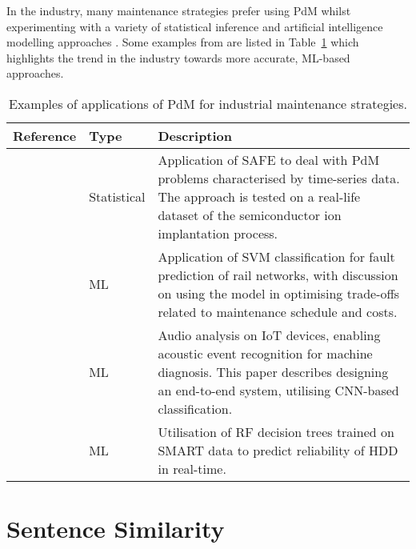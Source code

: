 \documentclass[10pt,oneside]{report}
\begin{document}
In the industry, many maintenance strategies prefer using PdM whilst experimenting with a variety of statistical inference and artificial intelligence modelling approaches \cite{mobley2002introduction, jezzini2013effects}. Some examples from \cite{carvalho2019systematic} are listed in Table~\ref{tab:pdmPaperTable} which highlights the trend in the industry towards more accurate, ML-based approaches.

\begin{table}[htbp]
    \fontsize{8}{12}\selectfont
    \centering
    \caption{\fontsize{9}{10}\selectfont Examples of applications of PdM for industrial maintenance strategies.}
    \label{tab:pdmPaperTable}
    \begin{adjustbox}{max width=\textwidth}
    \begin{tabular}{p{2.5cm} p{2.5cm} p{8cm}}
        \toprule
        \textbf{Reference} & \textbf{Type} & \textbf{Description} \\
        \midrule
        \cite{susto2016dealing} & Statistical & Application of SAFE to deal with PdM problems characterised by time-series data. The approach is tested on a real-life dataset of the semiconductor ion implantation process.\\
        \cite{li2014improving} & ML & Application of SVM classification for fault prediction of rail networks, with discussion on using the model in optimising trade-offs related to maintenance schedule and costs.\\
        \cite{pan2017cognitive} & ML & Audio analysis on IoT devices, enabling acoustic event recognition for machine diagnosis. This paper describes designing an end-to-end system, utilising CNN-based classification.\\
        \cite{su2018real} & ML & Utilisation of RF decision trees trained on SMART data to predict reliability of HDD in real-time. \\
        \bottomrule
    \end{tabular}
    \end{adjustbox}
\end{table}


\section{Sentence Similarity}
\end{document}

